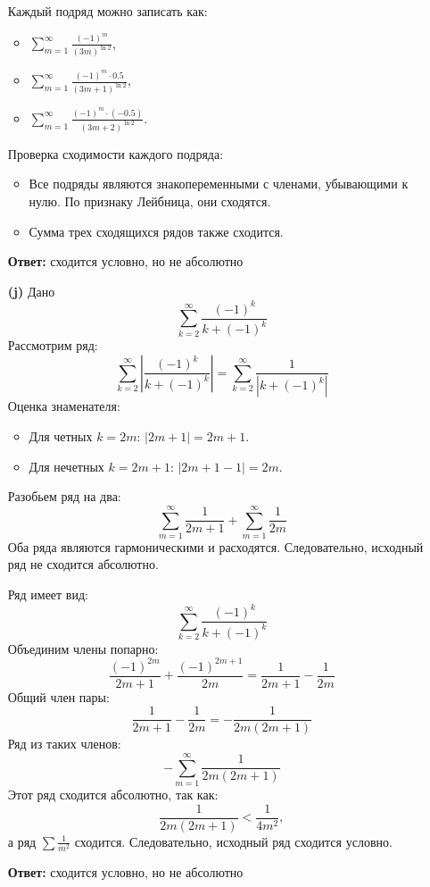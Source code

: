 \documentclass[a4paper]{article}
\begin{document}
\begin{enumerate}
Каждый подряд можно записать как:
\begin{itemize}
\item \( \sum_{m=1}^{\infty} \frac{(-1)^m}{(3m)^{\ln 2}} \),
\item \( \sum_{m=1}^{\infty} \frac{(-1)^m \cdot 0.5}{(3m + 1)^{\ln 2}} \),
\item \( \sum_{m=1}^{\infty} \frac{(-1)^m \cdot (-0.5)}{(3m + 2)^{\ln 2}} \).
\end{itemize}

Проверка сходимости каждого подряда:
\begin{itemize}
\item Все подряды являются знакопеременными с членами, убывающими к нулю. По признаку Лейбница, они сходятся.
\item Сумма трех сходящихся рядов также сходится.
\end{itemize}
\textbf{Ответ: } сходится условно, но не абсолютно

\item[\textbf{(j)}]Дано
$$\sum_{k=2}^{\infty} \frac{(-1)^k}{k + (-1)^k}$$
Рассмотрим ряд:
\[
\sum_{k=2}^{\infty} \left| \frac{(-1)^k}{k + (-1)^k} \right| = 
\sum_{k=2}^{\infty} \frac{1}{|k + (-1)^k|}
\]
Оценка знаменателя:
\begin{itemize}
\item Для четных \( k = 2m \): \( |2m + 1| = 2m + 1 \).
\item Для нечетных \( k = 2m + 1 \): \( |2m + 1 - 1| = 2m \).
\end{itemize}

Разобьем ряд на два:
\[
\sum_{m=1}^{\infty} \frac{1}{2m + 1} + \sum_{m=1}^{\infty} \frac{1}{2m}
\]
Оба ряда являются гармоническими и расходятся. Следовательно, исходный ряд не сходится абсолютно.

Ряд имеет вид:
\[
\sum_{k=2}^{\infty} \frac{(-1)^k}{k + (-1)^k}
\]
Объединим члены попарно:
\[
\frac{(-1)^{2m}}{2m + 1} + \frac{(-1)^{2m + 1}}{2m} = \frac{1}{2m + 1} - \frac{1}{2m}
\]
Общий член пары:
\[
\frac{1}{2m + 1} - \frac{1}{2m} = -\frac{1}{2m(2m + 1)}
\]
Ряд из таких членов:
\[
-\sum_{m=1}^{\infty} \frac{1}{2m(2m + 1)}
\]
Этот ряд сходится абсолютно, так как:
\[
\frac{1}{2m(2m + 1)} < \frac{1}{4m^2},
\]
а ряд \( \sum \frac{1}{m^2} \) сходится. Следовательно, исходный ряд сходится условно.

\textbf{Ответ: } сходится условно, но не абсолютно

\end{enumerate}
\end{document}
